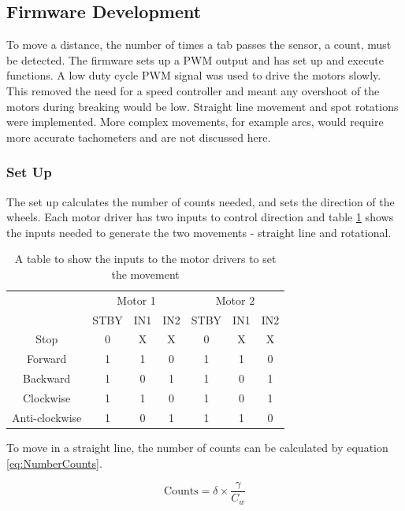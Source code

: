 \subsection{Firmware Development}

To move a distance, the number of times a tab passes the sensor, a count, must be detected. The firmware sets up a PWM output and has set up and execute functions. A low duty cycle PWM signal was used to drive the motors slowly. This removed the need for a speed controller and meant any overshoot of the motors during breaking would be low. Straight line movement and spot rotations were implemented. More complex movements, for example arcs, would require more accurate tachometers and are not discussed here. 

\subsubsection{Set Up}
The set up calculates the number of counts needed, and sets the direction of the wheels. Each motor driver has two inputs to control direction and table \ref{table:MotorDirection} shows the inputs needed to generate the two movements - straight line and rotational. 

\begin{table}
\centering
\caption{A table to show the inputs to the motor drivers to set the movement}
\label{table:MotorDirection}
\begin{tabular}{|c|c|c|c|c|c|c|}\cline{2-7}
\multicolumn{1}{c|}{ }&\multicolumn{3}{|c|}{Motor 1}&\multicolumn{3}{|c|}{Motor 2}\\\cline{2-7}
\multicolumn{1}{c|}{ }	&	STBY 	&	IN1	& IN2 	& STBY 	& IN1 	& IN2	\\ \hline
Stop					&	0		&	X	&	X	&	0	&	X	&	X	\\
Forward					&	1		&	1	&	0	&	1	&	1	&	0	\\	
Backward				&	1		&	0	&	1	&	1	&	0	&	1	\\
Clockwise				&	1		&	1	&	0	&	1	&	0	&	1	\\
Anti-clockwise 			&	1		&	0	&	1	&	1	&	1	&	0	\\\hline
\end{tabular}

\end{table}

To move in a straight line, the number of counts can be calculated by equation \eqref{eq:NumberCounts}. 

\begin{equation}
\label{eq:NumberCounts}
\text{Counts} = \delta \times \frac{\gamma}{C_w}
\end{equation}

